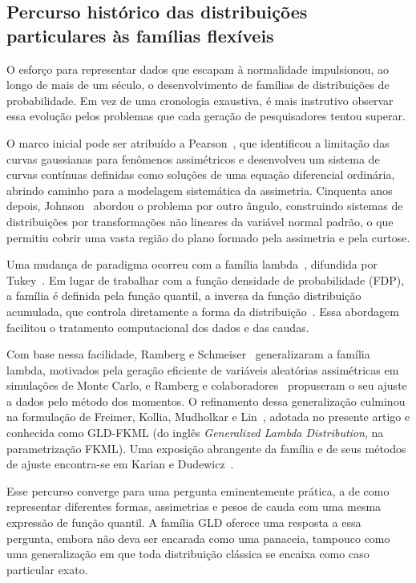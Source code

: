 \subsection{Percurso histórico das distribuições particulares às famílias flexíveis}

O esforço para representar dados que escapam à normalidade impulsionou, ao longo de mais de um século, o desenvolvimento de famílias de distribuições de probabilidade. Em vez de uma cronologia exaustiva, é mais instrutivo observar essa evolução pelos problemas que cada geração de pesquisadores tentou superar.

O marco inicial pode ser atribuído a Pearson~\cite{pearson1895}, que identificou a limitação das curvas gaussianas para fenômenos assimétricos e desenvolveu um sistema de curvas contínuas definidas como soluções de uma equação diferencial ordinária, abrindo caminho para a modelagem sistemática da assimetria. Cinquenta anos depois, Johnson~\cite{johnson1949} abordou o problema por outro ângulo, construindo sistemas de distribuições por transformações não lineares da variável normal padrão, o que permitiu cobrir uma vasta região do plano formado pela assimetria e pela curtose.

Uma mudança de paradigma ocorreu com a família lambda~\cite{hastings1947}, difundida por Tukey~\cite{tukey1960}. Em lugar de trabalhar com a função densidade de probabilidade (FDP), a família é definida pela função quantil, a inversa da função distribuição acumulada, que controla diretamente a forma da distribuição~\cite{gilchrist2000}. Essa abordagem facilitou o tratamento computacional dos dados e das caudas.

Com base nessa facilidade, Ramberg e Schmeiser~\cite{ramberg1974} generalizaram a família lambda, motivados pela geração eficiente de variáveis aleatórias assimétricas em simulações de Monte Carlo, e Ramberg e colaboradores~\cite{ramberg1979} propuseram o seu ajuste a dados pelo método dos momentos. O refinamento dessa generalização culminou na formulação de Freimer, Kollia, Mudholkar e Lin~\cite{freimer1988}, adotada no presente artigo e conhecida como GLD-FKML (do inglês \textit{Generalized Lambda Distribution}, na parametrização FKML). Uma exposição abrangente da família e de seus métodos de ajuste encontra-se em Karian e Dudewicz~\cite{karian2011}.

Esse percurso converge para uma pergunta eminentemente prática, a de como representar diferentes formas, assimetrias e pesos de cauda com uma mesma expressão de função quantil. A família GLD oferece uma resposta a essa pergunta, embora não deva ser encarada como uma panaceia, tampouco como uma generalização em que toda distribuição clássica se encaixa como caso particular exato.

